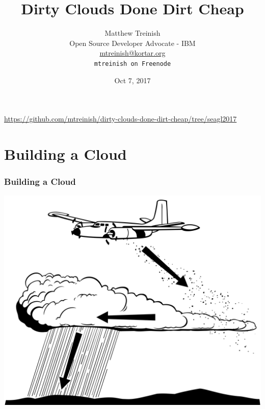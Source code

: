 \documentclass[aspectratio=169,11pt,hyperref={colorlinks=true}]{beamer}
\author[Matthew Treinish]{%
    \texorpdfstring{%
        \centering
        Matthew Treinish\\
        Open Source Developer Advocate - IBM \\
        \href{mailto:mtreinish@kortar.org}{mtreinish@kortar.org}\\
        \texttt{mtreinish on Freenode}
   }
   {Matthew Treinish}
}
\date{Oct 7, 2017}
\title[Dirty Clouds Done Dirt Cheap
\hspace{2em}\insertframenumber/\inserttotalframenumber]{Dirty Clouds Done Dirt Cheap}
\begin{document}
{%
\begin{frame}[noframenumbering]
    \hypersetup{colorlinks,urlcolor=white}
    \titlepage{}
    \centering
    \href{https://github.com/mtreinish/dirty-clouds-done-dirt-cheap/tree/seagl2017}{https://github.com/mtreinish/dirty-clouds-done-dirt-cheap/tree/seagl2017}
\end{frame}
}

\section{Building a Cloud}
\begin{frame}
\frametitle{Building a Cloud}
\centering
\includegraphics[width=.775\textwidth]{cloud_seeding.png}
\end{frame}
\end{document}

